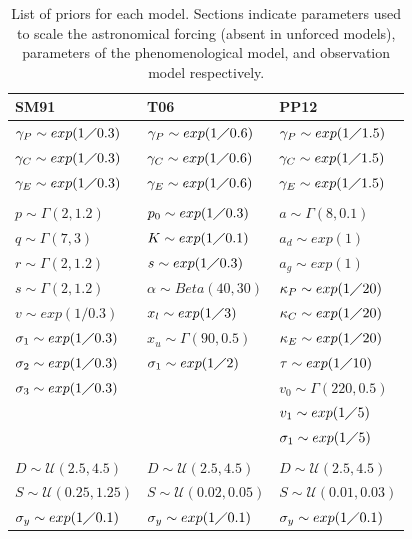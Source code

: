 \documentclass[a4paper,12pt]{article}
\begin{document}
\begin{table}[t]
\begin{center}
\begin{tabular}{lll}
\toprule
SM91 & T06 &PP12 \\
\midrule
$\gamma_P \sim exp(1 \diagup 0.3)$ & $\gamma_P\sim exp(1 \diagup 0.6)$ & $\gamma_P\sim exp(1 \diagup 1.5)$ \\
$\gamma_C\sim exp(1 \diagup 0.3)$ & $\gamma_C\sim exp(1 \diagup 0.6)$ & $\gamma_C\sim exp(1 \diagup 1.5)$ \\
$\gamma_E\sim exp(1 \diagup 0.3)$ & $\gamma_E\sim exp(1 \diagup 0.6)$ & $\gamma_E\sim exp(1 \diagup 1.5)$ \\
&  & \\
$p\sim \Gamma(2,1.2)$ & $p_0\sim exp(1 \diagup 0.3)$ & $a\sim \Gamma(8,0.1)$\\
$q\sim \Gamma(7,3)$ & $K\sim exp(1 \diagup 0.1)$ & $a_d\sim exp(1)$\\
$r\sim \Gamma(2,1.2)$ & $s\sim exp(1 \diagup 0.3)$ & $a_g\sim exp(1)$\\
$s\sim \Gamma(2,1.2)$ & $\alpha\sim Beta(40,30)$ & $\kappa_P\sim exp(1 \diagup 20)$ \\ 
$v\sim exp(1/0.3)$ & $x_l\sim exp(1 \diagup 3)$ & $\kappa_C\sim exp(1 \diagup 20)$ \\
$\sigma_1\sim exp(1 \diagup 0.3)$ & $x_u\sim \Gamma(90,0.5)$ & $\kappa_E\sim exp(1 \diagup 20)$ \\
$\sigma_2\sim exp(1 \diagup 0.3)$ & $\sigma_1\sim exp(1 \diagup 2)$ & $\tau\sim exp(1 \diagup 10)$ \\
$\sigma_3\sim exp(1 \diagup 0.3)$ & & $v_0 \sim \Gamma(220,0.5)$ \\
& &  $v_1\sim exp(1 \diagup 5)$\\
& &  $\sigma_1\sim exp(1 \diagup 5)$ \\
&   & \\
$D\sim \mathcal{U}(2.5,4.5)$ & $D\sim \mathcal{U}(2.5,4.5)$ & $D\sim \mathcal{U}(2.5,4.5)$ \\
$S\sim \mathcal{U}(0.25,1.25)$ & $S\sim \mathcal{U}(0.02,0.05)$ & $S\sim \mathcal{U}(0.01,0.03)$ \\
$\sigma_y\sim exp(1 \diagup 0.1)$ & $\sigma_y\sim exp(1 \diagup 0.1)$ & $\sigma_y\sim exp(1 \diagup 0.1)$ \\
\bottomrule
\end{tabular}
\label{Tab:Priors}
\caption{List of priors for each model.
Sections indicate parameters used to scale the astronomical forcing (absent in unforced models), parameters of the phenomenological model, and observation model respectively.}
\end{center}
\end{table}
\end{document}
